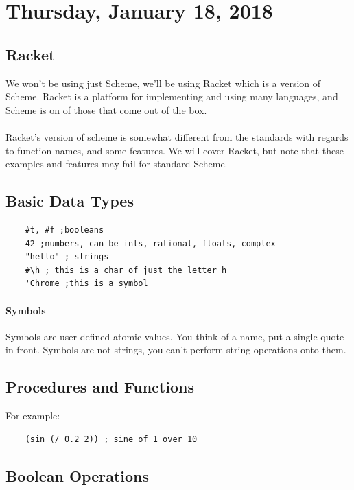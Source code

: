 \documentclass[12pt]{article}
\begin{document}
\newpage

\section{Thursday, January 18, 2018}

\subsection{Racket}

We won't be using just Scheme, we'll be using Racket which is a version of Scheme. Racket is a platform for implementing and using many languages, and Scheme is on of those that come out of the box.\\
\\
Racket's version of scheme is somewhat different from the standards with regards to function names, and some features. We will cover Racket, but note that these examples and features may fail for standard Scheme.

\subsection{Basic Data Types}

\begin{lstlisting}
    #t, #f ;booleans
    42 ;numbers, can be ints, rational, floats, complex
    "hello" ; strings
    #\h ; this is a char of just the letter h
    'Chrome ;this is a symbol
\end{lstlisting}

\paragraph{Symbols} Symbols are user-defined atomic values. You think of a name, put a single quote in front. Symbols are not strings, you can't perform string operations onto them.

\subsection{Procedures and Functions}
For example:
\begin{lstlisting}
    (sin (/ 0.2 2)) ; sine of 1 over 10
\end{lstlisting}

\subsection{Boolean Operations}
\end{document}
